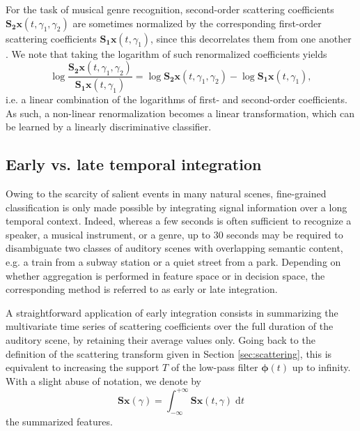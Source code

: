 \documentclass[journal]{IEEEtran}
\makeatletter
\newcommand*{\eg}{e.g.\@\xspace}
\newcommand*{\ie}{i.e.\@\xspace}
\newcommand*{\vs}{vs.\@\xspace}
\makeatother
\begin{document}
For the task of musical genre recognition, second-order scattering coefficients $\mathbf{S_2}\boldsymbol{x}(t,\gamma_1,\gamma_2)$ are sometimes normalized by the corresponding first-order scattering coefficients $\mathbf{S_1}\boldsymbol{x}(t,\gamma_1)$, since this decorrelates them from one another \cite{Anden2014}.
We note that taking the logarithm of such renormalized coefficients yields
\begin{equation}
\log \dfrac{\mathbf{S_2}\boldsymbol{x}(t,\gamma_1,\gamma_2)}{\mathbf{S_1}\boldsymbol{x}(t,\gamma_1)} =
\log \mathbf{S_2}\boldsymbol{x}(t, \gamma_1, \gamma_2) -
\log \mathbf{S_1}\boldsymbol{x}(t, \gamma_1),
\end{equation}
\ie a linear combination of the logarithms of first- and second-order coefficients.
As such, a non-linear renormalization becomes a linear transformation, which can be learned by a linearly discriminative classifier.

\subsection{Early \vs late temporal integration}
\label{sec:eili}

Owing to the scarcity of salient events in many natural scenes,
fine-grained classification is only made
possible by integrating signal information over a long temporal context.
Indeed, whereas a few seconds is often sufficient to recognize a speaker,
a musical instrument, or a genre, up to $30$ seconds may be required
to disambiguate two classes of auditory scenes with overlapping semantic content, \eg a train from a subway station or a quiet street from a park.
Depending on whether aggregation is performed in feature space or in decision space, the corresponding method is referred to as early or late integration.

A straightforward application of early integration consists in summarizing the multivariate time series of scattering coefficients over the full duration of the auditory scene, by retaining their average values only.
Going back to the definition of the scattering transform given in Section \ref{sec:scattering}, this is equivalent to increasing the support $T$ of the low-pass filter $\boldsymbol{\phi}(t)$ up to infinity. With a slight abuse of notation, we denote by
\begin{equation}
\mathbf{S}\boldsymbol{x}(\gamma) =
\int_{-\infty}^{+\infty} \mathbf{S}\boldsymbol{x}(t,\gamma)\;\mathrm{d}t
\end{equation}
the summarized features.
\end{document}
